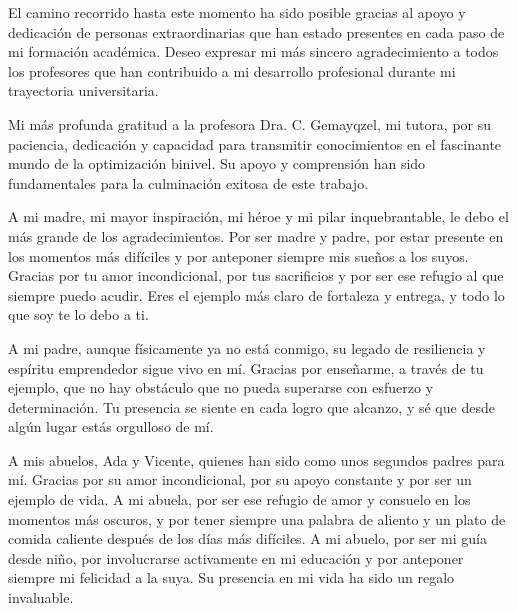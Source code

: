 \begin{acknowledgements}

    \noindent
    El camino recorrido hasta este momento ha sido posible gracias al apoyo y dedicación de personas extraordinarias que han estado presentes en cada paso de mi formación académica. Deseo expresar mi más sincero agradecimiento a todos los profesores que han contribuido a mi desarrollo profesional durante mi trayectoria universitaria.
    
    \vspace{1em}
    
    \noindent
    Mi más profunda gratitud a la profesora Dra. C. Gemayqzel, mi tutora, por su paciencia, dedicación y capacidad para transmitir conocimientos en el fascinante mundo de la optimización binivel. Su apoyo y comprensión han sido fundamentales para la culminación exitosa de este trabajo.
    
    \vspace{1em}
    
    \noindent
    A mi madre, mi mayor inspiración, mi héroe y mi pilar inquebrantable, le debo el más grande de los agradecimientos. Por ser madre y padre, por estar presente en los momentos más difíciles y por anteponer siempre mis sueños a los suyos. Gracias por tu amor incondicional, por tus sacrificios y por ser ese refugio al que siempre puedo acudir. Eres el ejemplo más claro de fortaleza y entrega, y todo lo que soy te lo debo a ti.
    
    \vspace{1em}
    
    \noindent
    
    A mi padre, aunque físicamente ya no está conmigo, su legado de resiliencia y espíritu emprendedor sigue vivo en mí. Gracias por enseñarme, a través de tu ejemplo, que no hay obstáculo que no pueda superarse con esfuerzo y determinación. Tu presencia se siente en cada logro que alcanzo, y sé que desde algún lugar estás orgulloso de mí.
    
    \vspace{1em}

    \noindent
    A mis abuelos, Ada y Vicente, quienes han sido como unos segundos padres para mí. Gracias por su amor incondicional, por su apoyo constante y por ser un ejemplo de vida. A mi abuela, por ser ese refugio de amor y consuelo en los momentos más oscuros, y por tener siempre una palabra de aliento y un plato de comida caliente después de los días más difíciles. 
    A mi abuelo, por ser mi guía desde niño, por involucrarse activamente en mi educación y por anteponer siempre mi felicidad a la suya. Su presencia en mi vida ha sido un regalo invaluable.
    

\end{acknowledgements}
